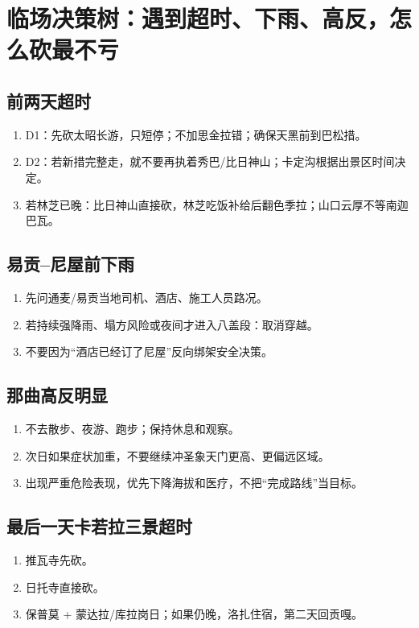 \documentclass[10.5pt,a4paper]{ctexart}
\begin{document}
\section{临场决策树：遇到超时、下雨、高反，怎么砍最不亏}

\subsection{前两天超时}
\begin{enumerate}
  \item D1：先砍太昭长游，只短停；不加思金拉错；确保天黑前到巴松措。
  \item D2：若新措完整走，就不要再执着秀巴/比日神山；卡定沟根据出景区时间决定。
  \item 若林芝已晚：比日神山直接砍，林芝吃饭补给后翻色季拉；山口云厚不等南迦巴瓦。
\end{enumerate}

\subsection{易贡--尼屋前下雨}
\begin{enumerate}
  \item 先问通麦/易贡当地司机、酒店、施工人员路况。
  \item 若持续强降雨、塌方风险或夜间才进入八盖段：取消穿越。
  \item 不要因为“酒店已经订了尼屋”反向绑架安全决策。
\end{enumerate}

\subsection{那曲高反明显}
\begin{enumerate}
  \item 不去散步、夜游、跑步；保持休息和观察。
  \item 次日如果症状加重，不要继续冲圣象天门更高、更偏远区域。
  \item 出现严重危险表现，优先下降海拔和医疗，不把“完成路线”当目标。
\end{enumerate}

\subsection{最后一天卡若拉三景超时}
\begin{enumerate}
  \item 推瓦寺先砍。
  \item 日托寺直接砍。
  \item 保普莫 + 蒙达拉/库拉岗日；如果仍晚，洛扎住宿，第二天回贡嘎。
\end{enumerate}
\end{document}
